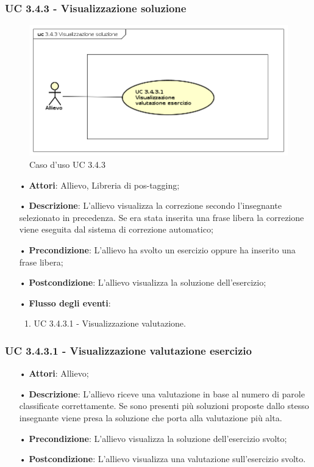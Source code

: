 \subsubsection{UC 3.4.3 - Visualizzazione soluzione}

\begin{figure}[H]
\centering
\includegraphics[width=17cm]{img/UC343.png} 
\caption{Caso d'uso UC 3.4.3}\label{fig:343}
\end{figure}

\begin{itemize}
\item[•]\textbf{Attori}: Allievo, Libreria di pos-tagging;
\item[•]\textbf{Descrizione}: L'allievo visualizza la correzione secondo l'insegnante selezionato in precedenza. Se era stata inserita una frase libera la correzione viene eseguita dal sistema di correzione automatico;
\item[•]\textbf{Precondizione}: L'allievo ha svolto un esercizio oppure ha inserito una frase libera;
\item[•]\textbf{Postcondizione}: L'allievo visualizza la soluzione dell'esercizio;
\item[•]\textbf{Flusso degli eventi}:
\begin{enumerate}
\item UC 3.4.3.1 - Visualizzazione valutazione.  %
\end{enumerate}
\end{itemize}

\subsubsection{UC 3.4.3.1 - Visualizzazione valutazione esercizio}  %

\begin{itemize}
\item[•]\textbf{Attori}: Allievo;
\item[•]\textbf{Descrizione}: L'allievo riceve una valutazione in base al numero di parole classificate correttamente. Se sono presenti più soluzioni proposte dallo stesso insegnante viene presa la soluzione che porta alla valutazione più alta.
\item[•]\textbf{Precondizione}: L'allievo visualizza la soluzione dell'esercizio svolto;
\item[•]\textbf{Postcondizione}: L'allievo visualizza una valutazione sull'esercizio svolto.
\end{itemize}


